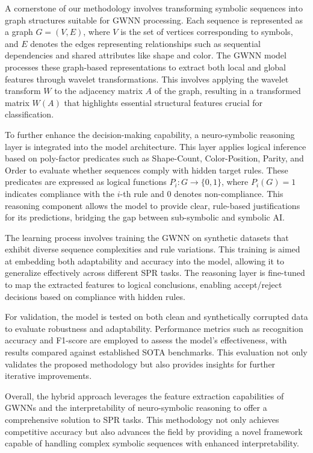 \documentclass{article}
\begin{document}
A cornerstone of our methodology involves transforming symbolic sequences into graph structures suitable for GWNN processing. Each sequence is represented as a graph \( G = (V, E) \), where \( V \) is the set of vertices corresponding to symbols, and \( E \) denotes the edges representing relationships such as sequential dependencies and shared attributes like shape and color. The GWNN model processes these graph-based representations to extract both local and global features through wavelet transformations. This involves applying the wavelet transform \( W \) to the adjacency matrix \( A \) of the graph, resulting in a transformed matrix \( W(A) \) that highlights essential structural features crucial for classification.

To further enhance the decision-making capability, a neuro-symbolic reasoning layer is integrated into the model architecture. This layer applies logical inference based on poly-factor predicates such as Shape-Count, Color-Position, Parity, and Order to evaluate whether sequences comply with hidden target rules. These predicates are expressed as logical functions \( P_i: G \rightarrow \{0, 1\} \), where \( P_i(G) = 1 \) indicates compliance with the \( i \)-th rule and \( 0 \) denotes non-compliance. This reasoning component allows the model to provide clear, rule-based justifications for its predictions, bridging the gap between sub-symbolic and symbolic AI.

The learning process involves training the GWNN on synthetic datasets that exhibit diverse sequence complexities and rule variations. This training is aimed at embedding both adaptability and accuracy into the model, allowing it to generalize effectively across different SPR tasks. The reasoning layer is fine-tuned to map the extracted features to logical conclusions, enabling accept/reject decisions based on compliance with hidden rules.

For validation, the model is tested on both clean and synthetically corrupted data to evaluate robustness and adaptability. Performance metrics such as recognition accuracy and F1-score are employed to assess the model's effectiveness, with results compared against established SOTA benchmarks. This evaluation not only validates the proposed methodology but also provides insights for further iterative improvements.

Overall, the hybrid approach leverages the feature extraction capabilities of GWNNs and the interpretability of neuro-symbolic reasoning to offer a comprehensive solution to SPR tasks. This methodology not only achieves competitive accuracy but also advances the field by providing a novel framework capable of handling complex symbolic sequences with enhanced interpretability.
\end{document}

